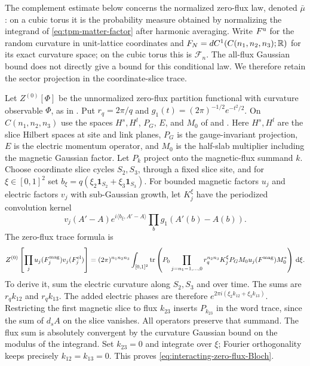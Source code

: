 The complement estimate below concerns the normalized
zero-flux law, denoted $\bar\mu$: on a cubic torus it is the
probability measure obtained by normalizing the integrand of
\eqref{eq:tpm-matter-factor} after harmonic averaging.
Write $F^{\rm u}$ for the random curvature in unit-lattice
coordinates and $F_N=dC^1(C(n_1,n_2,n_3);\mathbb R)$ for its exact
curvature space; on the cubic torus this is $\mathcal F_n$.
The all-flux Gaussian bound does not directly
give a bound for this conditional law.
We therefore retain the sector projection in
the coordinate-slice trace.

Let $Z^{(0)}[\Phi]$ be the unnormalized zero-flux partition
functional with curvature observable $\Phi$, as in
\cite[(34)]{ReferenceResponse}. Put $r_q=2\pi/q$ and
$g_1(t)=(2\pi)^{-1/2}e^{-t^2/2}$.
On $C(n_1,n_2,n_3)$ use the spaces $H^s,H^l$,
$P_G$, $E$, and $M_0$ of
\cite[(80)]{ChamberLattice} and
\cite[(82)]{ChamberLattice}.
Here $H^s,H^l$ are the slice Hilbert spaces at site and link
planes, $P_G$ is the gauge-invariant projection, $E$ is the
electric momentum operator, and $M_0$ is the half-slab
multiplier including the magnetic Gaussian factor.
Let $P_k$ project onto the magnetic-flux
summand $k$. Choose coordinate slice cycles
$S_2,S_3$, through a fixed slice site, and
for $\xi\in[0,1]^2$ set
$b_\xi=q(\xi_2\mathbf1_{S_2}+\xi_3\mathbf1_{S_3})$.
For bounded magnetic factors $u_j$ and
electric factors $v_j$ with sub-Gaussian growth,
let $K_j^\xi$ have the periodized convolution kernel
\[
 v_j(A'-A)e^{i\langle b_\xi,A'-A\rangle}
                         \prod_bg_1(A'(b)-A(b)).
\]
The zero-flux trace formula is
\begin{equation}\label{eq:interacting-zero-flux-Bloch}
 Z^{(0)}\left[\prod_ju_j(F_j^{\rm mag})v_j(F_j^{\rm el})\right]
 =(2\pi)^{n_1n_2n_3}\int_{[0,1]^2}
 \operatorname{tr}\left(P_0\prod_{j=n_1-1,\ldots,0}
                  r_q^{n_2n_3}K_j^\xi P_GM_0u_j(F^{\rm mag})M_0^*\right)
                                                        \,\mathrm d\xi .
\end{equation}
To derive it, sum the electric curvature along
$S_2,S_3$ and over time. The sums are
$r_qk_{12}$ and $r_qk_{13}$.
The added electric phases are therefore
$e^{2\pi i(\xi_2k_{12}+\xi_3k_{13})}$.
Restricting the first magnetic slice to
flux $k_{23}$ inserts $P_{k_{23}}$ in the
word trace, since the sum of $d_sA$ on
the slice vanishes. All operators preserve
that summand. The flux sum is absolutely
convergent by the curvature Gaussian bound
on the modulus of the integrand.
Set $k_{23}=0$ and integrate over $\xi$;
Fourier orthogonality keeps precisely
$k_{12}=k_{13}=0$. This proves
\eqref{eq:interacting-zero-flux-Bloch}.

